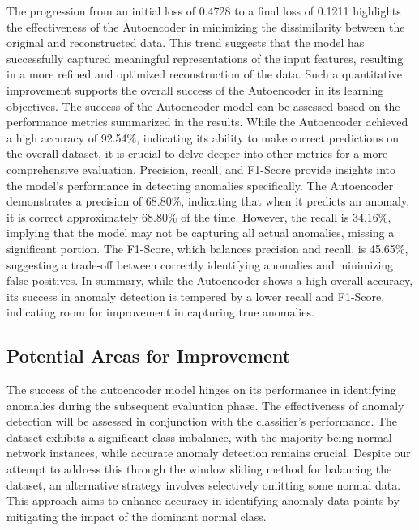 \documentclass[10pt,twocolumn,letterpaper]{article}
\begin{document}
The progression from an initial loss of 0.4728 to a final loss of 0.1211 highlights the effectiveness of the Autoencoder in minimizing the dissimilarity between the 
original and reconstructed data. This trend suggests that the model has successfully captured meaningful representations of the input features, resulting in a more 
refined and optimized reconstruction of the data. Such a quantitative improvement supports the overall success of the Autoencoder in its learning objectives.
The success of the Autoencoder model can be assessed based on the performance metrics summarized in the results. While the Autoencoder achieved a high accuracy 
of 92.54\%, indicating its ability to make correct predictions on the overall dataset, it is crucial to delve deeper into other metrics for a more comprehensive evaluation.
Precision, recall, and F1-Score provide insights into the model's performance in detecting anomalies specifically. 
The Autoencoder demonstrates a precision of 68.80\%, indicating that when it predicts an anomaly, it is correct approximately 68.80\% of the time. 
However, the recall is 34.16\%, implying that the model may not be capturing all actual anomalies, missing a significant portion.
The F1-Score, which balances precision and recall, is 45.65\%, suggesting a trade-off between correctly identifying anomalies and minimizing false positives.
In summary, while the Autoencoder shows a high overall accuracy, its success in anomaly detection is tempered by a lower recall and F1-Score, indicating room for 
improvement in capturing true anomalies.

\subsection*{Potential Areas for Improvement}
The success of the autoencoder model hinges on its performance in identifying anomalies during the subsequent evaluation phase. 
The effectiveness of anomaly detection will be assessed in conjunction with the classifier's performance.
The dataset exhibits a significant class imbalance, with the majority being normal network instances, while accurate anomaly detection remains crucial. 
Despite our attempt to address this through the window sliding method for balancing the dataset, an alternative strategy involves selectively omitting some normal data. 
This approach aims to enhance accuracy in identifying anomaly data points by mitigating the impact of the dominant normal class.
{\small


}
\end{document}
